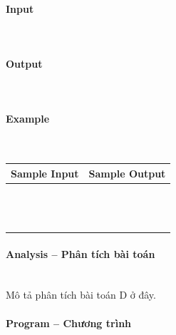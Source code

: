 \documentclass{article}
\begin{document}
\paragraph{Input} \mbox{} \\



\paragraph{Output}\mbox{} \\


\paragraph{Example}\mbox{} \\

\begin{table}[h]
    \centering
    \begin{tabular}{|l|r|}
        \hline
        \textbf{Sample Input} & \textbf{Sample Output} \\
        \hline
		&  \\ 
		&  \\ 
		&  \\ 
		&  \\ 
		&  \\
		&  \\ 
		&  \\ 
		&  \\ 
		&  \\ 
		&  \\ 
		&  \\ 
		&  \\
		&  \\ \hline
    \end{tabular}
\end{table}

\paragraph{Analysis -- Phân tích bài toán} \mbox{} \\

Mô tả phân tích bài toán D ở đây.

\paragraph{Program -- Chương trình} \mbox{} \\

\begin{lstlisting}

\end{lstlisting}
\end{document}

